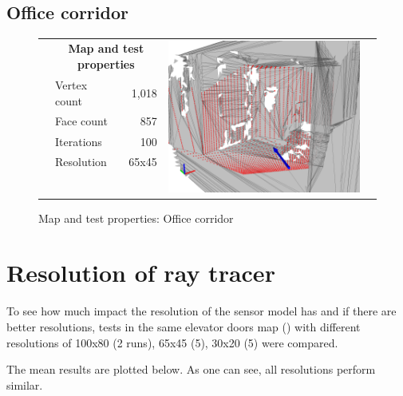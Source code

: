 \documentclass[Thesis.tex]{subfiles}
\begin{document}
\subsection{Office corridor}
\begin{figure}[h]\centering
\begin{tabularx}{\textwidth}{XlrrX}
  &\multicolumn{2}{c}{\small\bf Map and test properties} & \multirow{11}{*}{\includegraphics[width=.5\columnwidth]{pics/example_raytrace}}&\\
	&Vertex count & 1,018 &\\
  &Face count  & 857 &\\
  &Iterations  & 100 &\\
  &Resolution  & 65x45 &\\
  &&&\\
  &&&\\
  &&&\\
  &&&\\
  &&&\\
  &&&\\
\end{tabularx}
\caption{Map and test properties: Office corridor}
\label{fig:offmapprop}
\end{figure}


\section{Resolution of ray tracer}
To see how much impact the resolution of the sensor model has and if there are better resolutions, tests in the same elevator doors map () with different resolutions of 100x80 (2 runs), 65x45 (5), 30x20 (5) were compared.

The mean results are plotted below. As one can see, all resolutions perform similar.
\begin{center}
\end{center}
\end{document}

